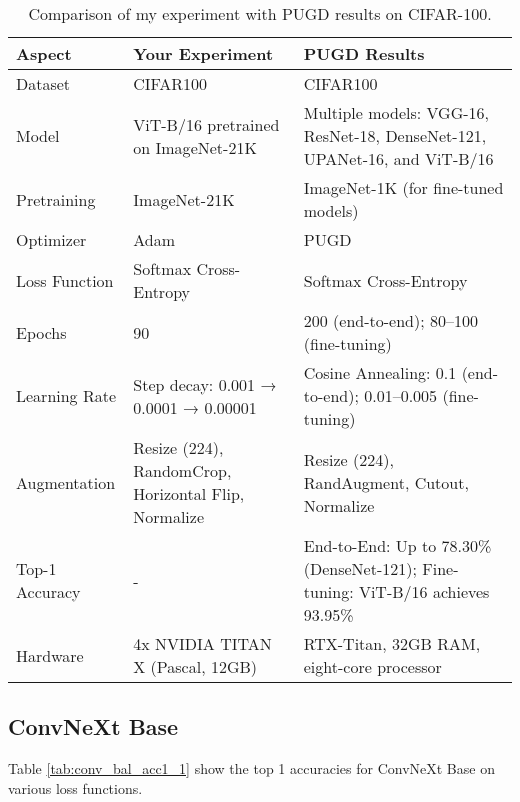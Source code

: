 \begin{table}[H]
    \centering
    \renewcommand{\arraystretch}{1.2} %
    \setlength{\tabcolsep}{4pt} %
    \begin{tabular}{lp{6cm}p{6cm}}
        \toprule
        \textbf{Aspect} & \textbf{Your Experiment} & \textbf{PUGD Results} \\ 
        \midrule
        Dataset           & CIFAR100 & CIFAR100 \\
        Model             & ViT-B/16 pretrained on ImageNet-21K & Multiple models: VGG-16, ResNet-18, DenseNet-121, UPANet-16, and ViT-B/16 \\
        Pretraining       & ImageNet-21K & ImageNet-1K (for fine-tuned models) \\
        Optimizer         & Adam & PUGD \\
        Loss Function     & Softmax Cross-Entropy & Softmax Cross-Entropy \\
        Epochs            & 90 & 200 (end-to-end); 80–100 (fine-tuning) \\
        Learning Rate     & Step decay: 0.001 → 0.0001 → 0.00001 & Cosine Annealing: 0.1 (end-to-end); 0.01–0.005 (fine-tuning) \\
        Augmentation      & Resize (224), RandomCrop, Horizontal Flip, Normalize & Resize (224), RandAugment, Cutout, Normalize \\
        Top-1 Accuracy    & - & End-to-End: Up to 78.30\% (DenseNet-121); Fine-tuning: ViT-B/16 achieves 93.95\% \\
        Hardware          & 4x NVIDIA TITAN X (Pascal, 12GB) & RTX-Titan, 32GB RAM, eight-core processor \\
        \bottomrule
    \end{tabular}
    \caption{Comparison of my experiment with PUGD results on CIFAR-100.}
    \label{tab:comparison3}
\end{table}


\subsection{ConvNeXt Base}

Table \ref{tab:conv_bal_acc1_1} show the top 1 accuracies for ConvNeXt Base on various loss functions.

